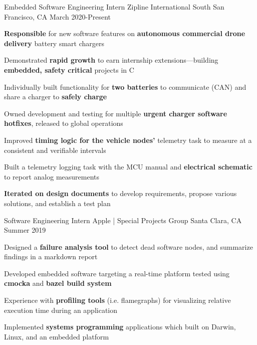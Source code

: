 

\begin{cventries}

  
  \cventry
    {Embedded Software Engineering Intern} %
    {Zipline International} %
    {South San Francisco, CA} %
    {March 2020-Present} %
    {
      \begin{cvitems} %
        \item {\textbf{Responsible} for new software features on \textbf{autonomous commercial drone delivery} battery smart chargers}
        \item {Demonstrated \textbf{rapid growth} to earn internship extensions---building \textbf{embedded, safety critical} projects in C}
        \item {Individually built functionality for \textbf{two batteries} to communicate (CAN) and share a charger to \textbf{safely charge}}
        \item {Owned development and testing for multiple \textbf{urgent charger software hotfixes}, released to global operations  } 
        \item {Improved \textbf{timing logic for the vehicle nodes'} telemetry task to measure at a consistent and verifiable intervals}
        \item {Built a telemetry logging task with the MCU manual and \textbf{electrical schematic} to report analog measurements}
        \item {\textbf{Iterated on design documents} to develop requirements, propose various solutions, and establish a test plan}
      \end{cvitems}
    }

  \cventry
    {Software Engineering Intern} %
    {Apple | Special Projects Group} %
    {Santa Clara, CA} %
    {Summer 2019} %
    {
      \begin{cvitems} %
      \item {Designed a \textbf{failure analysis tool} to detect dead software nodes, and summarize findings in a markdown report}
      \item {Developed embedded software targeting a real-time platform tested using \textbf{cmocka} and \textbf{bazel build system}} 
      \item {Experience with \textbf{profiling tools} (i.e. flamegraphs) for visualizing relative execution time during an application} 
      \item {Implemented \textbf{systems programming} applications which built on Darwin, Linux, and an embedded platform }
      \end{cvitems}
    }


\end{cventries}

